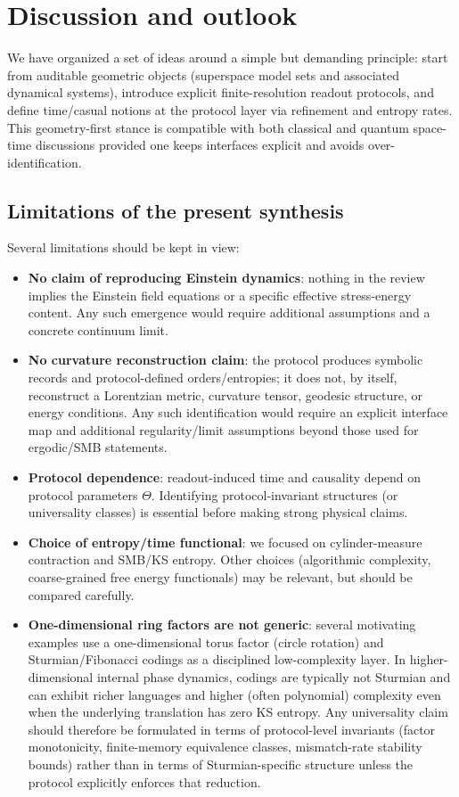 \section{Discussion and outlook}\label{sec:discussion}

We have organized a set of ideas around a simple but demanding principle: start from auditable geometric objects (superspace model sets and associated dynamical systems), introduce explicit finite-resolution readout protocols, and define time/casual notions at the protocol layer via refinement and entropy rates. This geometry-first stance is compatible with both classical and quantum space-time discussions provided one keeps interfaces explicit and avoids over-identification.

\subsection{Limitations of the present synthesis}\label{sec:discussion:limitations}

Several limitations should be kept in view:
\begin{itemize}[leftmargin=*,itemsep=2pt]
  \item \textbf{No claim of reproducing Einstein dynamics}: nothing in the review implies the Einstein field equations or a specific effective stress-energy content. Any such emergence would require additional assumptions and a concrete continuum limit.
  \item \textbf{No curvature reconstruction claim}: the protocol produces symbolic records and protocol-defined orders/entropies; it does not, by itself, reconstruct a Lorentzian metric, curvature tensor, geodesic structure, or energy conditions. Any such identification would require an explicit interface map and additional regularity/limit assumptions beyond those used for ergodic/SMB statements.
  \item \textbf{Protocol dependence}: readout-induced time and causality depend on protocol parameters $\Theta$. Identifying protocol-invariant structures (or universality classes) is essential before making strong physical claims.
  \item \textbf{Choice of entropy/time functional}: we focused on cylinder-measure contraction and SMB/KS entropy. Other choices (algorithmic complexity, coarse-grained free energy functionals) may be relevant, but should be compared carefully.
  \item \textbf{One-dimensional ring factors are not generic}: several motivating examples use a one-dimensional torus factor (circle rotation) and Sturmian/Fibonacci codings as a disciplined low-complexity layer. In higher-dimensional internal phase dynamics, codings are typically not Sturmian and can exhibit richer languages and higher (often polynomial) complexity even when the underlying translation has zero KS entropy. Any universality claim should therefore be formulated in terms of protocol-level invariants (factor monotonicity, finite-memory equivalence classes, mismatch-rate stability bounds) rather than in terms of Sturmian-specific structure unless the protocol explicitly enforces that reduction.
\end{itemize}

